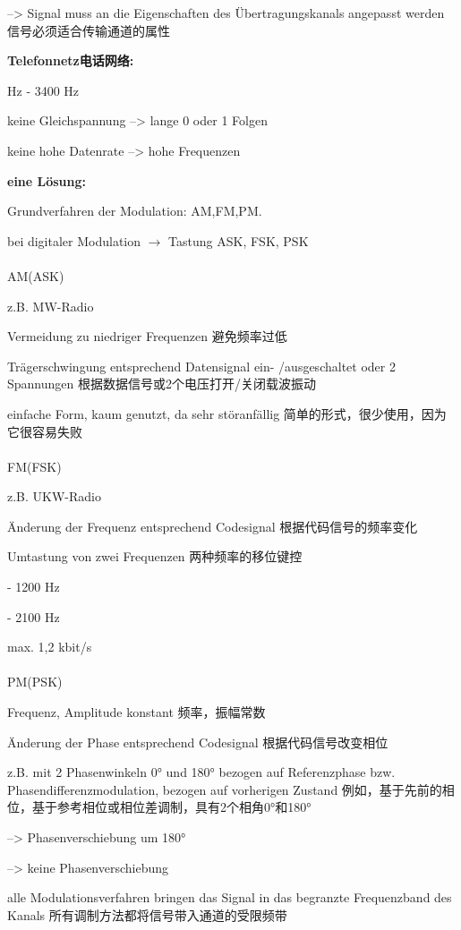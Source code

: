 \documentclass[fleqn]{article}
\begin{document}
--> Signal muss an die Eigenschaften des Übertragungskanals angepasst werden
信号必须适合传输通道的属性

\textbf{Telefonnetz电话网络:}

 Hz - 3400 Hz

\qquad keine Gleichspannung --> lange 0 oder 1 Folgen

\qquad keine hohe Datenrate --> hohe Frequenzen

\textbf{eine Lösung:}

 Grundverfahren der Modulation: AM,FM,PM.

\qquad bei digitaler Modulation $\rightarrow$ Tastung ASK, FSK, PSK
\\
\\
 AM(ASK)

z.B. MW-Radio

Vermeidung zu niedriger Frequenzen 避免频率过低

Trägerschwingung entsprechend Datensignal ein- /ausgeschaltet oder 2 Spannungen 根据数据信号或2个电压打开/关闭载波振动

einfache Form, kaum genutzt, da sehr störanfällig 简单的形式，很少使用，因为它很容易失败
\\
\\
 FM(FSK)

z.B. UKW-Radio

Änderung der Frequenz entsprechend Codesignal 根据代码信号的频率变化

Umtastung von zwei Frequenzen 两种频率的移位键控

 - 1200 Hz

 - 2100 Hz

max. 1,2 kbit/s
\\
\\
 PM(PSK)

Frequenz, Amplitude konstant 频率，振幅常数

Änderung der Phase entsprechend Codesignal 根据代码信号改变相位

z.B. mit 2 Phasenwinkeln 0° und 180° bezogen auf Referenzphase bzw. Phasendifferenzmodulation, bezogen auf vorherigen Zustand
例如，基于先前的相位，基于参考相位或相位差调制，具有2个相角0°和180°

	-->	Phasenverschiebung um 180°

	-->	keine Phasenverschiebung

alle Modulationsverfahren bringen das Signal in das begranzte Frequenzband des Kanals
所有调制方法都将信号带入通道的受限频带
\end{document}
